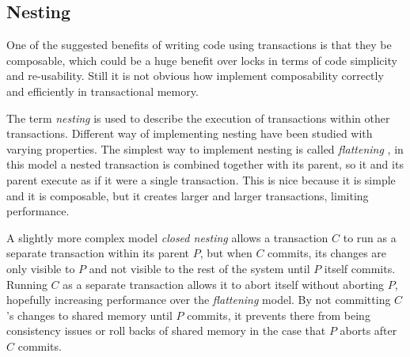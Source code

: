 \subsection{Nesting}
One of the suggested benefits of writing code using transactions is that they be composable,
 which could be a huge benefit over locks in terms of code simplicity and re-usability.
Still it is not obvious how implement composability correctly and efficiently in transactional memory.

The term \emph{nesting} is used to describe the execution of transactions within other transactions.
Different way of implementing nesting have been studied with varying properties.
The simplest way to implement nesting is called \emph{flattening} \cite{},
in this model a nested
 transaction is combined together with its parent, so it and its parent execute as if it were a single transaction.
This is nice because it is simple and it is composable, but it creates larger and larger transactions, limiting performance.

A slightly more complex model \emph{closed nesting} \cite{1133985} allows a transaction $C$ to run as a separate
 transaction within its parent $P$, but when $C$ commits, its changes are only visible 
to $P$ and not visible to the rest of the system until $P$ itself commits.
Running $C$ as a separate transaction allows it to abort itself without aborting $P$, 
hopefully increasing performance over the \emph{flattening} model.
By not committing $C$'s changes to shared memory until $P$ commits, it prevents there 
from being consistency issues or roll backs of shared memory in the case that $P$ aborts after $C$ commits.

